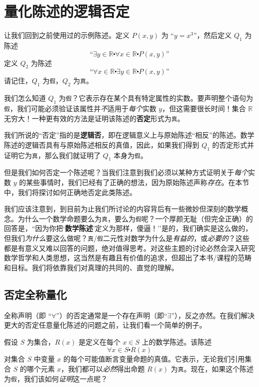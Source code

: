 \section{量化陈述的逻辑否定}\label{sec:section4.4}

让我们回到之前使用过的示例陈述。定义 $P(x, y)$ 为 ``$y = x^3$''，然后定义 $Q_1$ 为陈述
\[\text{``}\exists y \in \mathbb{R} \centerdot \forall x \in \mathbb{R} \centerdot P(x, y)\text{''}\]
定义 $Q_2$ 为陈述
\[\text{``}\forall x \in \mathbb{R} \centerdot \exists y \in \mathbb{R} \centerdot P(x, y)\text{''}\]
请记住，$Q_1$ 为\verb|假|，$Q_2$ 为\verb|真|。

我们怎么知道 $Q_1$ 为\verb|假|？它表示存在某个具有特定属性的实数。要声明整个语句为\verb|假|，我们可能必须验证该属性并\emph{不}适用于\emph{每个}实数 $y$，但这需要很长时间！集合 $\mathbb{R}$ 无穷大！一种更有效的方法是证明该陈述的\textbf{否定}形式为\verb|真|。

我们所说的``否定''指的是\textbf{逻辑否}，即在逻辑意义上与原始陈述``相反''的陈述。数学陈述的逻辑否具有与原始陈述相反的真值，因此，如果我们得到 $Q_1$ 的否定形式并证明它为\verb|真|，那么我们就证明了 $Q_1$ 本身为\verb|假|。

但是我们如何否定一个陈述呢？当我们注意到我们必须以某种方式证明关于\emph{每个}实数 $y$ 的某些事情时，我们已经有了正确的想法，因为原始陈述声称\emph{存在}。在本节中，我们将探讨如何正确地否定此类陈述。

我们应该注意到，到目前为止我们所讨论的内容背后有一些微妙但深刻的数学概念。为什么一个数学命题要么为\verb|真|，要么为\verb|假|呢？一个厚颜无耻（但完全正确）的回答是，``因为你把`\textbf{数学陈述}'定义为那样，傻逼！''是的，我们确实是这么做的，但我们\emph{为什么}要这么做呢？\verb|真|/\verb|假|二元性对数学为什么是\emph{有益的}，或\emph{必要的}？这些都是有意义又难以回答的问题，绝对值得思考。对这些主题的讨论必然会深入研究数学哲学和人类思想，这当然是有趣且有价值的追求，但超出了本书/课程的范畴和目标。我们将依靠我们对真理的共同的、直觉的理解。

\subsection{否定全称量化}

全称声明（即 ``$\forall$''）的否定通常是一个存在声明（即``$\exists$''），反之亦然。在我们解决更大的否定任意量化陈述的问题之前，让我们看一个简单的例子。

假设 $S$ 为集合，$R(x)$ 是定义在每个 $x \in S$ 上的数学陈述。该陈述
\[\forall x \in S \centerdot R(x)\]
对集合 $S$ 中变量 $x$ 的每个可能值断言变量命题的真值。它表示，无论我们引用集合 $S$ 的哪个元素 $x$，我们都可以\emph{必然}得出命题 $R(x)$ 为\verb|真|。现在，如果这个陈述为\verb|假|，我们该如何\emph{证明}这一点呢？

